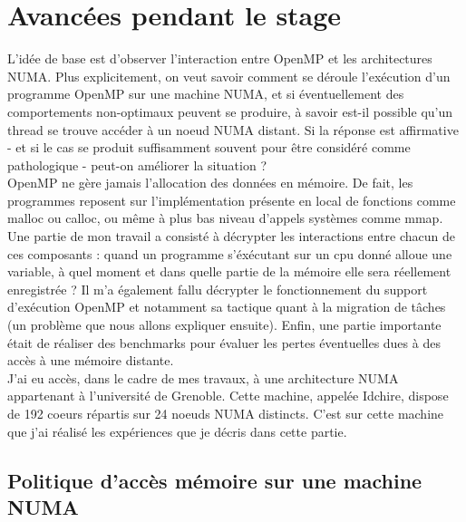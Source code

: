\documentclass{report}
\begin{document}
\section{Avancées pendant le stage}
L'idée de base est d'observer l'interaction entre OpenMP et les architectures NUMA. Plus explicitement,
on veut savoir comment se déroule l'exécution d'un programme OpenMP sur une machine NUMA, et si 
éventuellement des comportements non-optimaux peuvent se produire, à savoir est-il possible qu'un thread
se trouve accéder à un noeud NUMA distant. Si la réponse est affirmative - et si le cas se produit 
suffisamment souvent pour être considéré comme pathologique - peut-on améliorer la situation ?
\\OpenMP ne gère jamais l'allocation des données en mémoire. De fait, les programmes reposent sur 
l'implémentation présente en local de fonctions comme malloc ou calloc, ou même à plus bas niveau
d'appels systèmes comme mmap. Une partie de mon travail a consisté à décrypter les interactions
entre chacun de ces composants : quand un programme s'éxécutant sur un cpu donné alloue une variable,
à quel moment et dans quelle partie de la mémoire elle sera réellement enregistrée ? Il m'a également fallu
décrypter le fonctionnement du support d'exécution OpenMP et notamment sa tactique quant à la migration de
tâches (un problème que nous allons expliquer ensuite). Enfin, une partie importante était de réaliser des 
benchmarks pour évaluer les pertes éventuelles dues à des accès à une mémoire distante. 
\\J'ai eu accès, dans le cadre de mes travaux, à une architecture NUMA appartenant à l'université de 
Grenoble. Cette machine, appelée Idchire, dispose de 192 coeurs répartis sur 24 noeuds NUMA distincts. C'est
sur cette machine que j'ai réalisé les expériences que je décris dans cette partie.

\subsection{Politique d'accès mémoire sur une machine NUMA}
\end{document}
